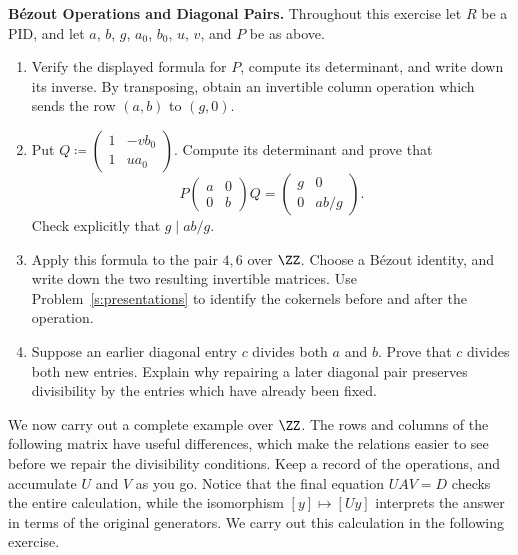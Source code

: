 \documentclass[12pt,reqno]{amsart}
\begin{document}
\begin{problems}
\item\label{s:repair} \textbf{B\'ezout Operations and Diagonal Pairs.} Throughout this exercise let $R$ be a PID, and let $a$, $b$, $g$, $a_0$, $b_0$, $u$, $v$, and $P$ be as above.
\begin{enumerate}
\item Verify the displayed formula for $P$, compute its determinant, and write down its inverse. By transposing, obtain an invertible column operation which sends the row $(a,b)$ to $(g,0)$.
\item Put $Q\coloneqq\left(\begin{smallmatrix}1&-vb_0\\1&ua_0\end{smallmatrix}\right)$. Compute its determinant and prove that
\[
P\begin{pmatrix}a&0\\0&b\end{pmatrix}Q=\begin{pmatrix}g&0\\0&ab/g\end{pmatrix}.
\]
Check explicitly that $g\mid ab/g$.
\item Apply this formula to the pair $4,6$ over $\ZZ$. Choose a B\'ezout identity, and write down the two resulting invertible matrices. Use Problem~\ref{s:presentations} to identify the cokernels before and after the operation.
\item Suppose an earlier diagonal entry $c$ divides both $a$ and $b$. Prove that $c$ divides both new entries. Explain why repairing a later diagonal pair preserves divisibility by the entries which have already been fixed.
\end{enumerate}
\end{problems}

\hrulefill

We now carry out a complete example over $\ZZ$. The rows and columns of the following matrix have useful differences, which make the relations easier to see before we repair the divisibility conditions. Keep a record of the operations, and accumulate $U$ and $V$ as you go. Notice that the final equation $UAV=D$ checks the entire calculation, while the isomorphism $[y]\mapsto[Uy]$ interprets the answer in terms of the original generators. We carry out this calculation in the following exercise.

\hrulefill
\end{document}
